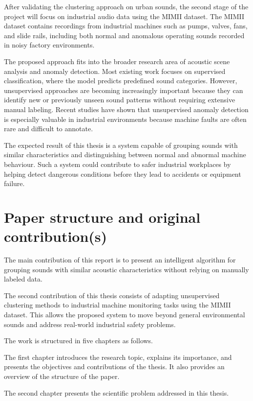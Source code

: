\documentclass[runningheads,a4paper,11pt]{report}
\begin{document}
After validating the clustering approach on urban sounds, the second stage of the project will focus on industrial audio data using the MIMII dataset. The MIMII dataset contains recordings from industrial machines such as pumps, valves, fans, and slide rails, including both normal and anomalous operating sounds recorded in noisy factory environments. 

The proposed approach fits into the broader research area of acoustic scene analysis and anomaly detection. Most existing work focuses on supervised classification, where the model predicts predefined sound categories. However, unsupervised approaches are becoming increasingly important because they can identify new or previously unseen sound patterns without requiring extensive manual labeling. Recent studies have shown that unsupervised anomaly detection is especially valuable in industrial environments because machine faults are often rare and difficult to annotate.

The expected result of this thesis is a system capable of grouping sounds with similar characteristics and distinguishing between normal and abnormal machine behaviour. Such a system could contribute to safer industrial workplaces by helping detect dangerous conditions before they lead to accidents or equipment failure.

\section{Paper structure and original contribution(s)}
\label{section:structure}

The main contribution of this report is to present an intelligent algorithm for grouping sounds with similar acoustic characteristics without relying on manually labeled data.

The second contribution of this thesis consists of adapting unsupervised clustering methods to industrial machine monitoring tasks using the MIMII dataset. This allows the proposed system to move beyond general environmental sounds and address real-world industrial safety problems.

The work is structured in five chapters as follows.

The first chapter introduces the research topic, explains its importance, and presents the objectives and contributions of the thesis. It also provides an overview of the structure of the paper.

The second chapter presents the scientific problem addressed in this thesis.
\end{document}
